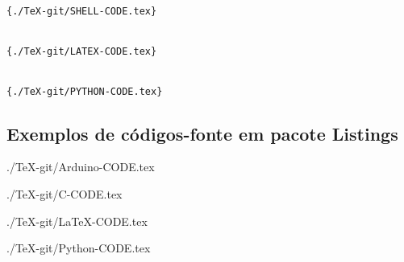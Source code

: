\begin{multicols}{2}
{\begin{verbatim}

{./TeX-git/SHELL-CODE.tex}


{./TeX-git/LATEX-CODE.tex}


{./TeX-git/PYTHON-CODE.tex}
\end{verbatim}
}

\subsection[Exemplos de códigos-fonte em pacote Listings]{Exemplos de códigos-fonte em pacote Listings}



{./TeX-git/Arduino-CODE.tex}


{./TeX-git/C-CODE.tex}


{./TeX-git/LaTeX-CODE.tex}


{./TeX-git/Python-CODE.tex}

\end{multicols}
